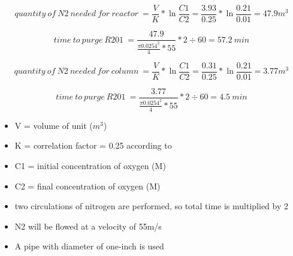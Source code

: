     \begin{equation}
        quantity\:of\:N2\:needed\:for\:reactor\:=\frac{V}{K} * \ln \frac{C1}{C2} = \frac{3.93}{0.25} * \ln \frac{0.21}{0.01} = 47.9 m^3
    \end{equation}
    
    \begin{equation}
        time\:to\:purge\:R201\:=\frac{47.9}{\frac{\pi 0.0254^2}{4} * 55} * 2 \div 60 = 57.2\:min
    \end{equation}
    
    \begin{equation}
        quantity\:of\:N2\:needed\:for\:column\:=\frac{V}{K} * \ln \frac{C1}{C2} = \frac{0.31}{0.25} * \ln \frac{0.21}{0.01} = 3.77 m^3
    \end{equation}
    
    \begin{equation}
        time\:to\:purge\:R201\:=\frac{3.77}{\frac{\pi 0.0254^2}{4} * 55} * 2 \div 60 = 4.5\:min
    \end{equation}
    
    \begin{itemize}
        \item V = volume of unit ($m^3$)
        \item K = correlation factor = 0.25 according to \textcite{}
        \item C1 = initial concentration of oxygen (M)
        \item C2 = final concentration of oxygen (M)
        \item two circulations of nitrogen are performed, so total time is multiplied by 2
        \item N2 will be flowed at a velocity of 55m/s
        \item A pipe with diameter of one-inch is used
    \end{itemize}